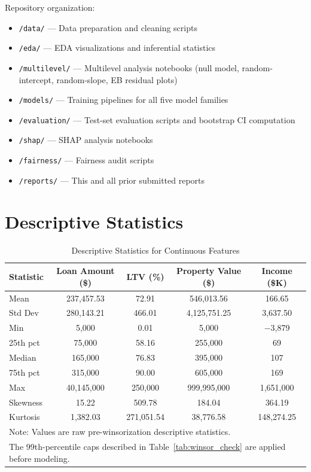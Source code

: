 \documentclass[12pt,letterpaper]{article}
\begin{document}
Repository organization:
\begin{itemize}
  \item \texttt{/data/} --- Data preparation and cleaning scripts
  \item \texttt{/eda/} --- EDA visualizations and inferential statistics
  \item \texttt{/multilevel/} --- Multilevel analysis notebooks (null model, random-intercept,
        random-slope, EB residual plots)
  \item \texttt{/models/} --- Training pipelines for all five model families
  \item \texttt{/evaluation/} --- Test-set evaluation scripts and bootstrap CI computation
  \item \texttt{/shap/} --- SHAP analysis notebooks
  \item \texttt{/fairness/} --- Fairness audit scripts
  \item \texttt{/reports/} --- This and all prior submitted reports
\end{itemize}

\section{Descriptive Statistics}

\begin{table}[H]
\centering
\caption{Descriptive Statistics for Continuous Features}
\label{tab:desc_stats}
\begin{tabular}{lcccc}
\toprule
\textbf{Statistic} & \textbf{Loan Amount (\$)} & \textbf{LTV (\%)} &
\textbf{Property Value (\$)} & \textbf{Income (\$K)} \\
\midrule
Mean     & 237,457.53 & 72.91      & 546,013.56  & 166.65 \\
Std Dev  & 280,143.21 & 466.01     & 4,125,751.25 & 3,637.50 \\
Min      & 5,000      & 0.01       & 5,000        & $-$3,879 \\
25th pct & 75,000     & 58.16      & 255,000      & 69 \\
Median   & 165,000    & 76.83      & 395,000      & 107 \\
75th pct & 315,000    & 90.00      & 605,000      & 169 \\
Max      & 40,145,000 & 250,000    & 999,995,000  & 1,651,000 \\
Skewness & 15.22      & 509.78     & 184.04       & 364.19 \\
Kurtosis & 1,382.03   & 271,051.54 & 38,776.58    & 148,274.25 \\
\bottomrule
\multicolumn{5}{l}{\small Note: Values are raw pre-winsorization descriptive statistics.} \\
\multicolumn{5}{l}{\small The 99th-percentile caps described in Table~\ref{tab:winsor_check} are applied before modeling.}
\end{tabular}
\end{table}
\end{document}
